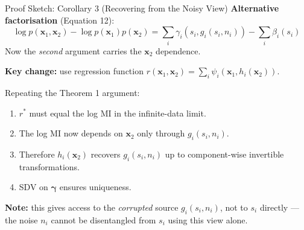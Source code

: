 \documentclass[aspectratio=169, 10pt]{beamer}
\begin{document}
\begin{frame}{Proof Sketch: Corollary 3 (Recovering from the Noisy View)}
  \textbf{Alternative factorisation} (Equation 12):
  \[
    \log p(\mathbf{x}_1,\mathbf{x}_2) - \log p(\mathbf{x}_1)p(\mathbf{x}_2)
    = \sum_i \gamma_i(s_i,g_i(s_i,n_i)) - \sum_i \beta_i(s_i)
  \]
  Now the \emph{second} argument carries the $\mathbf{x}_2$ dependence.

  \medskip
  \textbf{Key change:} use regression function
  $r(\mathbf{x}_1,\mathbf{x}_2) = \sum_i\psi_i(\mathbf{x}_1, h_i(\mathbf{x}_2))$.

  \medskip
  Repeating the Theorem 1 argument:
  \begin{enumerate}
    \item $r^*$ must equal the log MI in the infinite-data limit.
    \item The log MI now depends on $\mathbf{x}_2$ only through $g_i(s_i,n_i)$.
    \item Therefore $h_i(\mathbf{x}_2)$ recovers $g_i(s_i,n_i)$ up to component-wise
          invertible transformations.
    \item SDV on $\boldsymbol{\gamma}$ ensures uniqueness.
  \end{enumerate}

  \medskip
  \textbf{Note:} this gives access to the \emph{corrupted} source $g_i(s_i,n_i)$, not to
  $s_i$ directly — the noise $n_i$ cannot be disentangled from $s_i$ using this view alone.
\end{frame}
\end{document}
